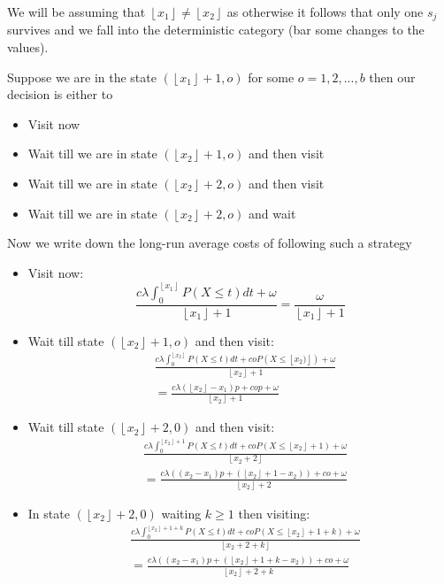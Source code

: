 \documentclass[a4paper,10pt]{article}
\newcommand{\floor}[1]{\left \lfloor #1 \right \rfloor}
\theoremstyle{definition}
\theoremstyle{definition}
\theoremstyle{remark}
\theoremstyle{definition}
\begin{document}
We will be assuming that $\floor{x_{1}} \neq \floor{x_{2}}$ as otherwise it follows that only one $s_{j}$ survives and we fall into the deterministic category (bar some changes to the values).

Suppose we are in the state $(\floor{x_{1}}+1,o)$ for some $o=1,2,...,b$ then our decision is either to
\begin{itemize}
\item Visit now
\item Wait till we are in state $(\floor{x_{2}}+1,o)$ and then visit
\item Wait till we are in state $(\floor{x_{2}}+2,o)$ and then visit
\item Wait till we are in state $(\floor{x_{2}}+2,o)$ and wait
\end{itemize}

Now we write down the long-run average costs of following such a strategy
\begin{itemize}
\item Visit now:
\begin{equation}
\frac{c \lambda \int_{0}^{\floor{x_{1}}} P(X \leq t)dt +\omega}{\floor{x_{1}}+1}
=\frac{\omega}{\floor{x_{1}}+1}
\end{equation}
\item Wait till state $(\floor{x_{2}}+1,o)$ and then visit:
\begin{align}
&\frac{c \lambda \int_{0}^{\floor{x_{2}}} P(X \leq t)dt + coP(X \leq \floor{x_{2})})+\omega}{\floor{x_{2}}+1} \nonumber \\&=\frac{c \lambda (\floor{x_{2}}-x_{1})p +cop + \omega}{\floor{x_{2}}+1}
\end{align}


\item Wait till state $(\floor{x_{2}}+2,0)$ and then visit:
\begin{align}
&\frac{c \lambda \int_{0}^{\floor{x_{2}}+1} P(X \leq t)dt +coP(X \leq \floor{x_{2}}+1)+\omega}{\floor{x_{2}+2}} \nonumber \\ &=\frac{c \lambda ((x_{2}-x_{1})p + (\floor{x_{2}}+1-x_{2}))+co+\omega}{\floor{x_{2}}+2}
\end{align}

\item In state $(\floor{x_{2}}+2,0)$ waiting $k \geq 1$ then visiting:
\begin{align}
&\frac{c \lambda \int_{0}^{\floor{x_{2}}+1+k} P(X \leq t)dt +coP(X \leq \floor{x_{2}}+1+k)+\omega}{\floor{x_{2}+2+k}} \nonumber \\ &=\frac{c \lambda ((x_{2}-x_{1})p + (\floor{x_{2}}+1+k-x_{2}))+co+\omega}{\floor{x_{2}}+2+k}
\end{align}

\end{itemize}
\end{document}
